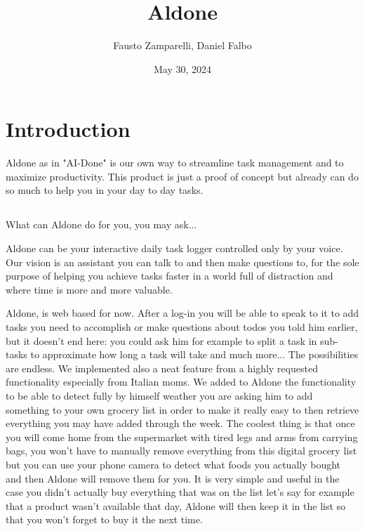 \documentclass{article}
\title{\textbf{Aldone}}
\author{Fausto Zamparelli, Daniel Falbo}
\date{May 30, 2024}
\begin{document}
\maketitle

\section*{\color{draculagreen}Introduction}
Aldone as in "AI-Done" is our own way to streamline task management and to maximize productivity. This product is just a proof of concept but already can do so much to help you in your day to day tasks.

\subsection*{\color{draculayellow}{Functionality}}
What can Aldone do for you, you may ask...

Aldone can be your interactive daily task logger controlled only by your voice. Our vision is an assistant you can talk to and then make questions to, for the sole purpose of helping you achieve tasks faster in a world full of distraction and where time is more and more valuable.

Aldone, is web based for now. After a log-in you will be able to speak to it to add tasks you need to accomplish or make questions about todos you told him earlier, but it doesn't end here: you could ask him for example to split a task in sub-tasks to approximate how long a task will take and  much more... The possibilities are endless. We implemented also a neat feature from a highly requested functionality especially from Italian moms. We added to Aldone the functionality to be able to detect fully by himself weather you are asking him to add something to your own grocery list in order to make it really easy to then retrieve everything you may have added through the week. The coolest thing is that once you will come home from the supermarket with tired legs and arms from carrying bags, you won't have to manually remove everything from this digital grocery list but you can use your phone camera to detect what foods you actually bought and then Aldone will remove them for you. It is very simple and useful in the case you didn't actually buy everything that was on the list let's say for example that a product wasn't available that day, Aldone will then keep it in the list so that you won't forget to buy it the next time. 

\newpage
\end{document}
